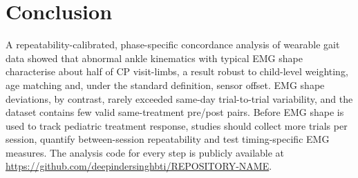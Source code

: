 \documentclass[conference]{IEEEtran}
\begin{document}
\section{Conclusion}
A repeatability-calibrated, phase-specific concordance analysis of wearable gait data showed that abnormal ankle kinematics with typical EMG shape characterise about half of CP visit-limbs, a result robust to child-level weighting, age matching and, under the standard definition, sensor offset. EMG shape deviations, by contrast, rarely exceeded same-day trial-to-trial variability, and the dataset contains few valid same-treatment pre/post pairs. Before EMG shape is used to track pediatric treatment response, studies should collect more trials per session, quantify between-session repeatability and test timing-specific EMG measures. The analysis code for every step is publicly available at \textcolor{red}{\url{https://github.com/deepindersinghbti/REPOSITORY-NAME}}. %
\end{document}
